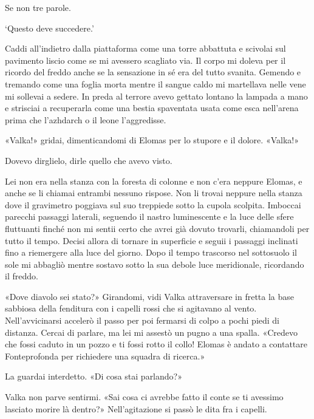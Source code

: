 Se non tre parole.

`Questo deve succedere.'

Caddi all'indietro dalla piattaforma come una torre abbattuta e scivolai
sul pavimento liscio come se mi avessero scagliato via. Il corpo mi
doleva per il ricordo del freddo anche se la sensazione in sé era del
tutto svanita. Gemendo e tremando come una foglia morta mentre il sangue
caldo mi martellava nelle vene mi sollevai a sedere. In preda al terrore
avevo gettato lontano la lampada a mano e strisciai a recuperarla come
una bestia spaventata usata come esca nell'arena prima che l'azhdarch o
il leone l'aggredisse.

«Valka!» gridai, dimenticandomi di Elomas per lo stupore e il dolore.
«Valka!»

\begin{figure}
	\centering
	\def\svgwidth{\columnwidth}
	\scalebox{0.2}{}
\end{figure}

Dovevo dirglielo, dirle quello che avevo visto.

Lei non era nella stanza con la foresta di colonne e non c'era neppure
Elomas, e anche se li chiamai entrambi nessuno rispose. Non li trovai
neppure nella stanza dove il gravimetro poggiava sul suo treppiede sotto
la cupola scolpita. Imboccai parecchi passaggi laterali, seguendo il
nastro luminescente e la luce delle sfere fluttuanti finché non mi
sentii certo che avrei già dovuto trovarli, chiamandoli per tutto il
tempo. Decisi allora di tornare in superficie e seguii i passaggi
inclinati fino a riemergere alla luce del giorno. Dopo il tempo
trascorso nel sottosuolo il sole mi abbagliò mentre sostavo sotto la sua
debole luce meridionale, ricordando il freddo.

«Dove diavolo sei stato?» Girandomi, vidi Valka attraversare in fretta
la base sabbiosa della fenditura con i capelli rossi che si agitavano al
vento. Nell'avvicinarsi accelerò il passo per poi fermarsi di colpo a
pochi piedi di distanza. Cercai di parlare, ma lei mi assestò un pugno a
una spalla. «Credevo che fossi caduto in un pozzo e ti fossi rotto il
collo! Elomas è andato a contattare Fonteprofonda per richiedere una
squadra di ricerca.»

La guardai interdetto. «Di cosa stai parlando?»

Valka non parve sentirmi. «Sai cosa ci avrebbe fatto il conte se ti
avessimo lasciato morire là dentro?» Nell'agitazione si passò le dita
fra i capelli.

